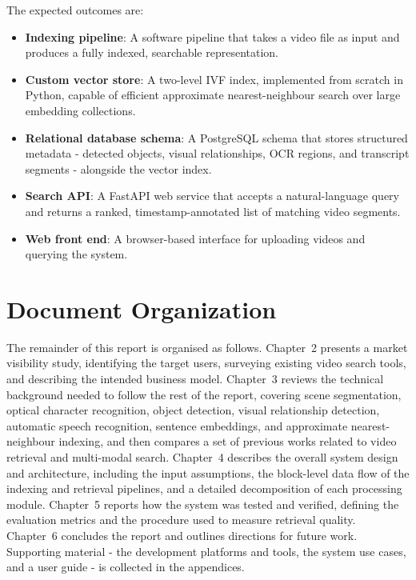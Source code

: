 \documentclass[12pt, a4paper]{report}
\begin{document}
The expected outcomes are:

\begin{itemize}
  \item \textbf{Indexing pipeline}: A software pipeline that takes a video
    file as input and produces a fully indexed, searchable representation.

  \item \textbf{Custom vector store}: A two-level IVF index, implemented
    from scratch in Python, capable of efficient approximate nearest-neighbour
    search over large embedding collections.

  \item \textbf{Relational database schema}: A PostgreSQL schema that stores
    structured metadata - detected objects, visual relationships, OCR regions,
    and transcript segments - alongside the vector index.

  \item \textbf{Search API}: A FastAPI web service that accepts a natural-language
    query and returns a ranked, timestamp-annotated list of matching video
    segments.

  \item \textbf{Web front end}: A browser-based interface for uploading
    videos and querying the system.
\end{itemize}

\section{Document Organization}

The remainder of this report is organised as follows. Chapter~2 presents a
market visibility study, identifying the target users, surveying existing
video search tools, and describing the intended business model.
Chapter~3 reviews the technical background needed to follow the rest of the
report, covering scene segmentation, optical character recognition, object
detection, visual relationship detection, automatic speech recognition, sentence
embeddings, and approximate nearest-neighbour indexing, and then compares a
set of previous works related to video retrieval and multi-modal search.
Chapter~4 describes the overall system design and architecture, including the
input assumptions, the block-level data flow of the indexing and retrieval
pipelines, and a detailed decomposition of each processing module.
Chapter~5 reports how the system was tested and verified, defining the
evaluation metrics and the procedure used to measure retrieval quality.
Chapter~6 concludes the report and outlines directions for future work.
Supporting material - the development platforms and tools, the system use
cases, and a user guide - is collected in the appendices.
\end{document}
